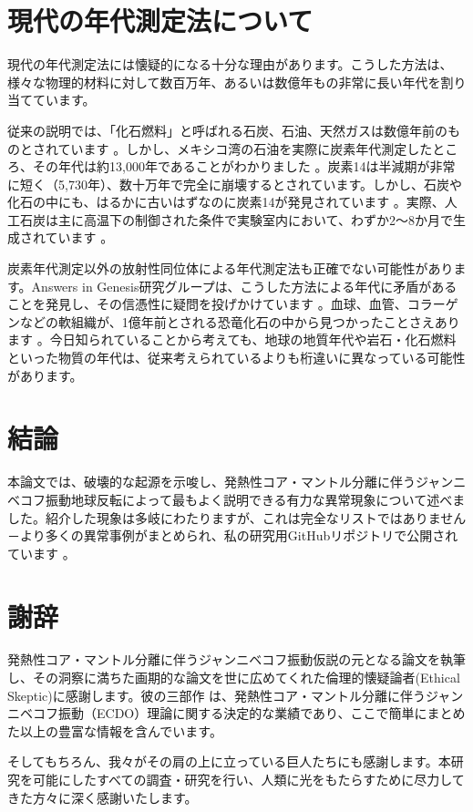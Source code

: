 \documentclass[10pt,twocolumn,letterpaper]{article}
\begin{document}
\section{現代の年代測定法について}

現代の年代測定法には懐疑的になる十分な理由があります。こうした方法は、様々な物理的材料に対して数百万年、あるいは数億年もの非常に長い年代を割り当てています。

従来の説明では、「化石燃料」と呼ばれる石炭、石油、天然ガスは数億年前のものとされています \cite{104}。しかし、メキシコ湾の石油を実際に炭素年代測定したところ、その年代は約13,000年であることがわかりました \cite{105}。炭素14は半減期が非常に短く（5,730年）、数十万年で完全に崩壊するとされています。しかし、石炭や化石の中にも、はるかに古いはずなのに炭素14が発見されています \cite{106}。実際、人工石炭は主に高温下の制御された条件で実験室内において、わずか2～8か月で生成されています \cite{107}。

炭素年代測定以外の放射性同位体による年代測定法も正確でない可能性があります。Answers in Genesis研究グループは、こうした方法による年代に矛盾があることを発見し、その信憑性に疑問を投げかけています \cite{108}。血球、血管、コラーゲンなどの軟組織が、1億年前とされる恐竜化石の中から見つかったことさえあります \cite{109,110}。今日知られていることから考えても、地球の地質年代や岩石・化石燃料といった物質の年代は、従来考えられているよりも桁違いに異なっている可能性があります。

\section{結論}

本論文では、破壊的な起源を示唆し、発熱性コア・マントル分離に伴うジャンニベコフ振動地球反転によって最もよく説明できる有力な異常現象について述べました。紹介した現象は多岐にわたりますが、これは完全なリストではありません－より多くの異常事例がまとめられ、私の研究用GitHubリポジトリで公開されています \cite{2}。

\section{謝辞}

発熱性コア・マントル分離に伴うジャンニベコフ振動仮説の元となる論文を執筆し、その洞察に満ちた画期的な論文を世に広めてくれた倫理的懐疑論者(Ethical Skeptic)に感謝します。彼の三部作 \cite{1} は、発熱性コア・マントル分離に伴うジャンニベコフ振動（ECDO）理論に関する決定的な業績であり、ここで簡単にまとめた以上の豊富な情報を含んでいます。

そしてもちろん、我々がその肩の上に立っている巨人たちにも感謝します。本研究を可能にしたすべての調査・研究を行い、人類に光をもたらすために尽力してきた方々に深く感謝いたします。

\clearpage
\twocolumn

{\small
\renewcommand{\refname}{参考文献}


}
\end{document}
